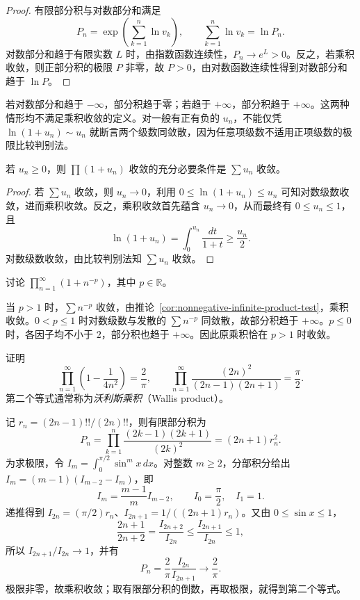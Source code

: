 \begin{proof}
有限部分积与对数部分和满足
\[
    P_n=\exp\left(\sum_{k=1}^n\ln v_k\right),\qquad
    \sum_{k=1}^n\ln v_k=\ln P_n.
\]
对数部分和趋于有限实数 $L$ 时，由指数函数连续性，$P_n\to e^L>0$。反之，若乘积收敛，则正部分积的极限 $P$ 非零，故 $P>0$，由对数函数连续性得到对数部分和趋于 $\ln P$。
\end{proof}

若对数部分和趋于 $-\infty$，部分积趋于零；若趋于 $+\infty$，部分积趋于 $+\infty$。这两种情形均不满足乘积收敛的定义。对一般有正有负的 $u_n$，不能仅凭 $\ln(1+u_n)\sim u_n$ 就断言两个级数同敛散，因为任意项级数不适用正项级数的极限比较判别法。

\begin{corollary}
\label{cor:nonnegative-infinite-product-test}
若 $u_n\geq0$，则 $\prod(1+u_n)$ 收敛的充分必要条件是 $\sum u_n$ 收敛。
\end{corollary}

\begin{proof}
若 $\sum u_n$ 收敛，则 $u_n\to0$，利用 $0\leq\ln(1+u_n)\leq u_n$ 可知对数级数收敛，进而乘积收敛。反之，乘积收敛首先蕴含 $u_n\to0$，从而最终有 $0\leq u_n\leq1$，且
\[
    \ln(1+u_n)=\int_0^{u_n}\frac{dt}{1+t}\geq\frac{u_n}{2}.
\]
对数级数收敛，由比较判别法知 $\sum u_n$ 收敛。
\end{proof}

\begin{example}
\label{ex:infinite-product-p-power}
讨论 $\prod_{n=1}^{\infty}(1+n^{-p})$，其中 $p\in\mathbb R$。
\end{example}

\begin{solve}
当 $p>1$ 时，$\sum n^{-p}$ 收敛，由推论~\ref{cor:nonnegative-infinite-product-test}，乘积收敛。$0<p\leq1$ 时对数级数与发散的 $\sum n^{-p}$ 同敛散，故部分积趋于 $+\infty$。$p\leq0$ 时，各因子均不小于 $2$，部分积也趋于 $+\infty$。因此原乘积恰在 $p>1$ 时收敛。
\end{solve}

\begin{example}
\label{ex:wallis-infinite-product}
证明
\begin{equation}
    \prod_{n=1}^{\infty}\left(1-\frac1{4n^2}\right)=\frac2\pi,
    \qquad
    \prod_{n=1}^{\infty}\frac{(2n)^2}{(2n-1)(2n+1)}=\frac\pi2.
    \label{eq:wallis-infinite-product}
\end{equation}
第二个等式通常称为\emph{沃利斯乘积}（Wallis product）。
\end{example}

\begin{solve}
记 $r_n=(2n-1)!!/(2n)!!$，则有限部分积为
\[
    P_n=\prod_{k=1}^n\frac{(2k-1)(2k+1)}{(2k)^2}
       =(2n+1)r_n^2.
\]
为求极限，令 $I_m=\int_0^{\pi/2}\sin^m x\,dx$。对整数 $m\geq2$，分部积分给出 $I_m=(m-1)(I_{m-2}-I_m)$，即
\[
    I_m=\frac{m-1}{m}I_{m-2},\qquad I_0=\frac\pi2,\quad I_1=1.
\]
递推得到 $I_{2n}=(\pi/2)r_n$、$I_{2n+1}=1/((2n+1)r_n)$。又由 $0\leq\sin x\leq1$，
\[
    \frac{2n+1}{2n+2}
       =\frac{I_{2n+2}}{I_{2n}}
       \leq\frac{I_{2n+1}}{I_{2n}}\leq1,
\]
所以 $I_{2n+1}/I_{2n}\to1$，并有
\[
    P_n=\frac2\pi\frac{I_{2n}}{I_{2n+1}}\longrightarrow\frac2\pi.
\]
极限非零，故乘积收敛；取有限部分积的倒数，再取极限，就得到第二个等式。
\end{solve}

